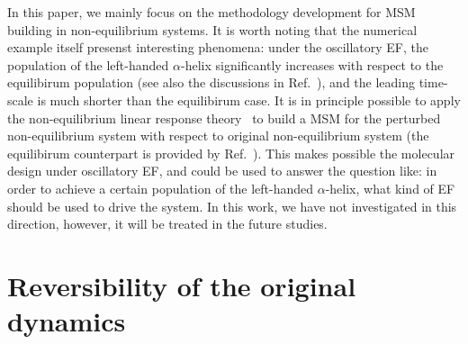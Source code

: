 \documentclass[aps, pre, preprint,unsortedaddress,a4paper,onecolumn]{revtex4}
\begin{document}
In this paper, we mainly focus on the methodology development for MSM
building in non-equilibrium systems. It is worth noting that the
numerical example itself presenst interesting phenomena: under the
oscillatory EF, the population of the left-handed $\alpha$-helix
significantly increases with respect to the equilibirum population
(see also the discussions in Ref.~\cite{wang2014exploring}),
and the leading time-scale is much shorter than the equilibirum case.
It is in principle possible to apply the non-equilibrium
linear response theory~\cite{wang2013linear} to build a MSM for the perturbed
non-equilibrium system with respect to original
non-equilibrium system
(the equilibirum counterpart is provided by Ref.~\cite{schutte2014markov}).
This makes possible the molecular design under
oscillatory EF, and could be used to answer the question like:
in order to achieve a certain population of  the left-handed $\alpha$-helix,
what kind of EF should be used to drive the system.
In this work, we have not investigated in this direction, however, it will
be treated in the future studies.


  



\appendix

\section{Reversibility of the original dynamics}
\label{sec:app-revs}
\end{document}
